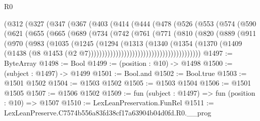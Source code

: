 \begin{lexlean}{R0}
\begin{coremodule}
            (@312
              (@327
                (@347
                  (@367
                    (@403
                      (@414
                        (@444
                          (@478
                            (@526
                              (@553
                                (@574
                                  (@590
                                    (@621
                                      (@655
                                        (@665
                                          (@689
                                            (@734
                                              (@742
                                                (@761
                                                  (@771
                                                    (@810
                                                      (@820
                                                        (@889
                                                          (@911
                                                            (@970
                                                              (@983
                                                                (@1035
                                                                  (@1245
                                                                    (@1294
                                                                      (@1313
                                                                        (@1340
                                                                          (@1354
                                                                            (@1370
                                                                              (@1409
                                                                                (@1438
                                                                                  (@8
                                                                                    @1453
                                                                                    (@2
                                                                                      @7)))))))))))))))))))))))))))))))))))))))))
@1497 := ByteArray
@1498 := Bool
@1499 := (position : @10) -> @1498
@1500 := (subject : @1497) -> @1499
@1501 := Bool.and
@1502 := Bool.true
@1503 := @1501 @1502
@1504 := @1503 @1502
@1505 := @1503 @1504
@1506 := @1501 @1505
@1507 := @1506 @1502
@1509 := fun (subject : @1497) => fun (position : @10) => @1507
@1510 := LexLeanPreservation.FunRel
@1511 := LexLeanPreserve.C7574b556a83fd38cf17a63904b04d0fd.R0.__prog

\end{coremodule}
\end{lexlean}
